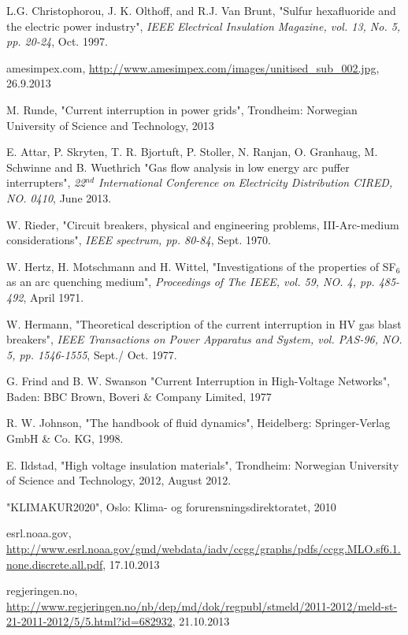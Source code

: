 \documentclass[10pt,b5paper,twoside]{article}
\begin{document}
\cleardoublepage
\begin{thebibliography}{10}
 L.G. Christophorou, J. K. Olthoff, and R.J. Van Brunt, "Sulfur hexafluoride and the electric power industry", \textit{IEEE Electrical Insulation Magazine, vol. 13, No. 5, pp. 20-24}, Oct. 1997.

 amesimpex.com, \url{http://www.amesimpex.com/images/unitised_sub_002.jpg}, 26.9.2013

 M. Runde, "Current interruption in power grids", Trondheim: Norwegian University of Science and Technology, 2013

 E. Attar, P. Skryten, T. R. Bjortuft, P. Stoller, N. Ranjan, O. Granhaug, M. Schwinne and B. Wuethrich "Gas flow analysis in low energy arc puffer interrupters", \textit{22$^{nd}$ International Conference on Electricity Distribution CIRED, NO. 0410}, June 2013.

 W. Rieder, "Circuit breakers, physical and engineering problems, III-Arc-medium considerations", \textit{IEEE spectrum, pp. 80-84}, Sept. 1970.

 W. Hertz, H. Motschmann and H. Wittel, "Investigations of the properties of SF$_6$ as an arc quenching medium", \textit{Proceedings of The IEEE, vol. 59, NO. 4, pp. 485-492}, April 1971.

 W. Hermann, "Theoretical description of the current interruption in HV gas blast breakers", \textit{IEEE Transactions on Power Apparatus and System, vol. PAS-96, NO. 5, pp. 1546-1555}, Sept./ Oct. 1977.

 G. Frind and B. W. Swanson "Current Interruption in High-Voltage Networks", Baden: BBC Brown, Boveri \& Company Limited, 1977

 R. W. Johnson, "The handbook of fluid dynamics", Heidelberg: Springer-Verlag GmbH \& Co. KG, 1998.

 E. Ildstad, "High voltage insulation materials", Trondheim: Norwegian University of Science and Technology, 2012, August 2012.

 "KLIMAKUR2020", Oslo: Klima- og forurensningsdirektoratet, 2010

 esrl.noaa.gov, \url{http://www.esrl.noaa.gov/gmd/webdata/iadv/ccgg/graphs/pdfs/ccgg.MLO.sf6.1.none.discrete.all.pdf}, 17.10.2013

 regjeringen.no, \url{http://www.regjeringen.no/nb/dep/md/dok/regpubl/stmeld/2011-2012/meld-st-21-2011-2012/5/5.html?id=682932}, 21.10.2013


\end{thebibliography}
\end{document}
